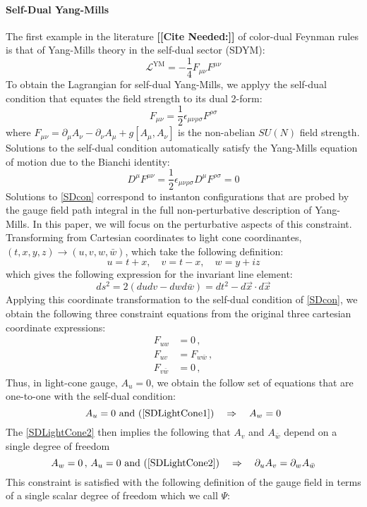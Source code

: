 \documentclass[11pt,letter]{article}
\def\be{\begin{equation}}
\def\ee{\end{equation}}
\newcommand{\citepls}[1]{{\bf\color{red}[[Cite Needed:#1]]}}
\begin{document}
\paragraph{Self-Dual Yang-Mills} The first example in the literature \citepls{} of color-dual Feynman rules is that of Yang-Mills theory in the self-dual sector (SDYM):
\be
\mathcal{L}^{\text{YM}} = -\frac{1}{4}F_{\mu\nu}F^{\mu\nu}
\ee
To obtain the Lagrangian for self-dual Yang-Mills, we applyy the self-dual condition that equates the field strength to its dual 2-form:
\be\label{SDcon}
F_{\mu\nu} = \frac{1}{2} \epsilon_{\mu\nu\rho\sigma}F^{\rho\sigma}
\ee
where $F_{\mu\nu} = \partial_\mu A_\nu -\partial_\nu A_\mu + g[A_\mu ,A_\nu]$ is the non-abelian $SU(N)$ field strength. Solutions to the self-dual condition automatically satisfy the Yang-Mills equation of motion due to the Bianchi identity:
\be
D^\mu F^{\mu\nu} = \frac{1}{2} \epsilon_{\mu\nu\rho\sigma}D^\mu F^{\rho\sigma} = 0
\ee
Solutions to \cref{SDcon} correspond to instanton configurations that are probed by the gauge field path integral in the full non-perturbative description of Yang-Mills. In this paper, we will focus on the perturbative aspects of this constraint. Transforming from Cartesian coordinates to light cone coordinantes, $(t,x,y,z) \rightarrow (u,v,w,\bar{w})$, which take the following definition:
\be
u = t+x,\quad v=t-x, \quad w = y+iz
\ee
which gives the following expression for the invariant line element:
\be
ds^2 = 2(dudv - dwd\bar{w}) = dt^2 - d\vec{x}\cdot d\vec{x}
\ee
Applying this coordinate transformation to the self-dual condition of \cref{SDcon}, we obtain the following three constraint equations from the original three cartesian coordinate expressions:
\begin{align} \label{SDLightCone1}
F_{uw} &=0\,,
\\
 \label{SDLightCone2}
 F_{uv} &= F_{w\bar{w}}\,,
\\
 \label{SDLightCone3}
 F_{v\bar{w}} &= 0\,,
\end{align}
Thus, in light-cone gauge, $A_u=0$, we obtain the follow set of equations that are one-to-one with the self-dual condition:
\be
A_u=0 \text{ and } (\ref{SDLightCone1}) \quad\Rightarrow \quad A_w=0
\ee
The \cref{SDLightCone2} then implies the following that $A_v$ and $A_{\bar{w}}$ depend on a single degree of freedom
\be
A_w=0\,,\,A_u=0 \text{ and } (\ref{SDLightCone2}) \quad\Rightarrow \quad \partial_u A_v = \partial_w A_{\bar{w}}
\ee
This constraint is  satisfied with the following definition of the gauge field in terms of a single scalar degree of freedom which we call $\Psi$:
\end{document}
